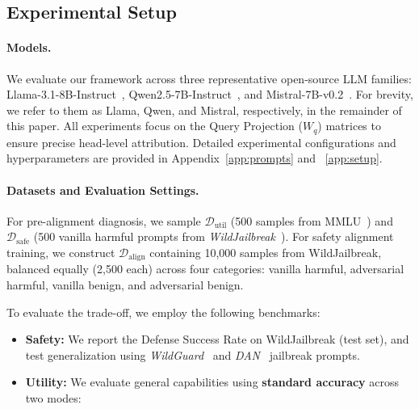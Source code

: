\documentclass[11pt]{article}
\begin{document}
\subsection{Experimental Setup}

\paragraph{Models.}
We evaluate our framework across three representative open-source LLM families: Llama-3.1-8B-Instruct~\cite{grattafiori2024llama3}, Qwen2.5-7B-Instruct~\cite{yang2024qwen2}, and Mistral-7B-v0.2~\cite{jiang2023mistral7b}. For brevity, we refer to them as Llama, Qwen, and Mistral, respectively, in the remainder of this paper. All experiments focus on the Query Projection ($W_q$) matrices to ensure precise head-level attribution.
Detailed experimental configurations and hyperparameters are provided in Appendix~\ref{app:prompts} and ~\ref{app:setup}.

\paragraph{Datasets and Evaluation Settings.}
For pre-alignment diagnosis, we sample $\mathcal{D}_{\text{util}}$ (500 samples from MMLU~\cite{hendryckstest2021}) and $\mathcal{D}_{\text{safe}}$ (500 vanilla harmful prompts from \textit{WildJailbreak}~\cite{wildteaming2024}).
For safety alignment training, we construct $\mathcal{D}_{\text{align}}$ containing 10,000 samples from WildJailbreak, balanced equally (2,500 each) across four categories: vanilla harmful, adversarial harmful, vanilla benign, and adversarial benign.

To evaluate the trade-off, we employ the following benchmarks:
\begin{itemize}[leftmargin=*, itemsep=2pt, topsep=0pt, parsep=0pt]
    \item \textbf{Safety:} We report the Defense Success Rate on WildJailbreak (test set), and test generalization using \textit{WildGuard}~\cite{wildguard2024} and \textit{DAN}~\cite{SCBSZ24} jailbreak prompts.
    
    \item \textbf{Utility:} We evaluate general capabilities using \textbf{standard accuracy} across two modes:
\end{itemize}
\end{document}

